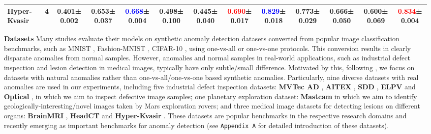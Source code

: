 \documentclass[10pt,twocolumn,letterpaper]{article}
\begin{document}
\begin{table*}[bt]
{\begin{tabular}{l@{}|c ||c||ccccc||ccccc}
   \textbf{Hyper-Kvasir$\ $}& 4 & 0.401\footnotesize{±0.002}& 0.653\footnotesize{±0.037}& \textcolor{blue}{\textbf{0.668}}\footnotesize{±0.004}& 0.498\footnotesize{±0.100}& 0.445\footnotesize{±0.040}& \textcolor{red}{\textbf{0.690}}\footnotesize{±0.017}& \textcolor{blue}{\textbf{0.829}}\footnotesize{±0.018}& 0.773\footnotesize{±0.029}& 0.666\footnotesize{±0.050}& 0.600\footnotesize{±0.069}& \textcolor{red}{\textbf{0.834}}\footnotesize{±0.004}\\
   \hline
    \end{tabular}
    }
  \label{tab:randomanomalies}\vspace{-0.3cm}
\end{table*}


\textbf{Datasets}
Many studies 
evaluate their models on synthetic anomaly detection datasets converted from popular image classification benchmarks, such as MNIST \cite{lecun1998gradient}, Fashion-MNIST \cite{xiao2017_online}, CIFAR-10 \cite{krizhevsky2009learning}, using one-vs-all or one-vs-one protocols. This conversion results in clearly disparate anomalies from normal samples. However, anomalies and normal samples in real-world applications, such as industrial defect inspection and lesion detection in medical images, typically have only subtle/small difference. Motivated by this, following \cite{yi2020patch, li2021cutpaste, pang2021explainable
}, we focus on datasets with natural anomalies rather than one-vs-all/one-vs-one based synthetic anomalies. Particularly, nine diverse datasets with real anomalies are used in our experiments, including five industrial defect inspection datasets: \textbf{MVTec AD} \cite{Bergmann_2019_CVPR}, \textbf{AITEX} \cite{silvestre2019public}, \textbf{SDD} \cite{Tabernik2019JIM}, \textbf{ELPV} \cite{deitsch2019elpv} and \textbf{Optical} \cite{wieler2007weakly}, in which we aim to inspect defective image samples; one planetary exploration dataset: \textbf{Mastcam} \cite{kerner2020comparison} in which we aim to identify geologically-interesting/novel images taken by Mars exploration rovers; and three medical image datasets for detecting lesions on different organs: \textbf{BrainMRI} \cite{salehi2021multiresolution}, \textbf{HeadCT} \cite{salehi2021multiresolution} and \textbf{Hyper-Kvasir} \cite{borgli2020hyperkvasir}. These datasets are popular benchmarks in the respective research domains and recently emerging as important benchmarks for anomaly detection \cite{Bergmann_2020_CVPR,yi2020patch,salehi2021multiresolution,pang2021explainable, Hou_2021_ICCV} (see \texttt{Appendix A} for detailed introduction of these datasets).
\end{document}
